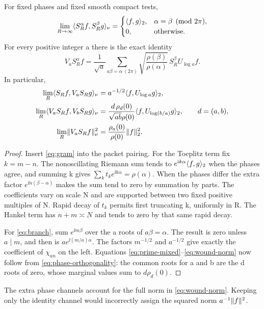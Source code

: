 \begin{theorem}\label{thm:packets}
For fixed phases and fixed smooth compact tests,
\begin{equation}\label{eq:phase-orthogonality}
\lim_{R\to\infty}\langle S_R^\alpha f,S_R^\beta g\rangle_\nu
=\begin{cases}\langle f,g\rangle_2,&\alpha=\beta\pmod{2\pi},\\0,&\text{otherwise}.
\end{cases}
\end{equation}
For every positive integer a there is the exact identity
\begin{equation}\label{eq:branch}
V_aS_R^\alpha f=\frac1{\sqrt a}
\sum_{a\beta=\alpha\ (2\pi)}
\sqrt{\frac{\rho(\beta)}{\rho(\alpha)}}\,
S_R^\beta U_{\log a}f .
\end{equation}
In particular,
\begin{align}
\lim_R\langle S_Rf,V_aS_Rg\rangle_\nu
 &=a^{-1/2}\langle f,U_{\log a}g\rangle_2,\label{eq:prime-mixed}\\
\lim_R\langle V_aS_Rf,V_bS_Rg\rangle_\nu
 &=\frac{d\,\rho_d(0)}{\sqrt{ab}\rho(0)}
       \langle f,U_{\log(b/a)}g\rangle_2,\qquad d=(a,b),\label{eq:wound-mixed}\\
\lim_R\lVert V_aS_Rf\rVert_\nu^2
 &=\frac{\rho_a(0)}{\rho(0)}\lVert f\rVert_2^2.\label{eq:wound-norm}
\end{align}
\end{theorem}
\begin{proof}
Insert \eqref{eq:gram} into the packet pairing. For the Toeplitz term
fix $k=m-n$. The nonoscillating Riemann sum tends to
$e^{\mathrm i k\alpha}\langle f,g\rangle_2$ when the phases agree, and summing k
gives $\sum_k t_ke^{\ii k\alpha}=\rho(\alpha)$.
When the phases differ the extra factor $e^{\ii n(\beta-\alpha)}$
makes the sum tend to zero by summation by parts. The coefficients
vary on scale N and are supported between two fixed positive
multiples of N. Rapid decay of $t_k$ permits first truncating k,
uniformly in R. The Hankel term has $n+m\asymp N$ and tends to zero
by that same rapid decay.

For \eqref{eq:branch}, sum $e^{\ii m\beta}$ over the a roots of
$a\beta=\alpha$. The result is zero unless $a\mid m$, and then is
$ae^{\ii(m/a)\alpha}$. The factors $m^{-1/2}$ and $a^{-1/2}$ give
exactly the coefficient of $\chi_{an}$ on the left. Equations
\eqref{eq:prime-mixed}--\eqref{eq:wound-norm} now follow from
\eqref{eq:phase-orthogonality}: the common roots for a and b are
the d roots of zero, whose marginal values sum to $d\rho_d(0)$.
\end{proof}
The extra phase channels account for the full norm in
\eqref{eq:wound-norm}. Keeping only the identity channel would
incorrectly assign the squared norm $a^{-1}\lVert f\rVert^2$.

